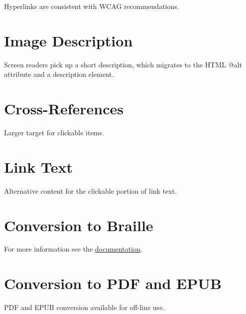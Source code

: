 \documentclass{article}
\begin{document}
Hyperlinks are consistent with WCAG recommendations.


\section{Image Description}

Screen readers pick up a short description, which migrates to the HTML @alt attribute and a description element.


\section{Cross-References}

Larger target for clickable items.


\section{Link Text}

Alternative content for the clickable portion of link text.


\section{Conversion to Braille}

For more information see the \href{https://pretextbook.org/doc/guide/html/publisher-braille.html}{documentation}.


\section{Conversion to PDF and EPUB}

PDF and EPUB conversion available for off-line use.
\end{document}
